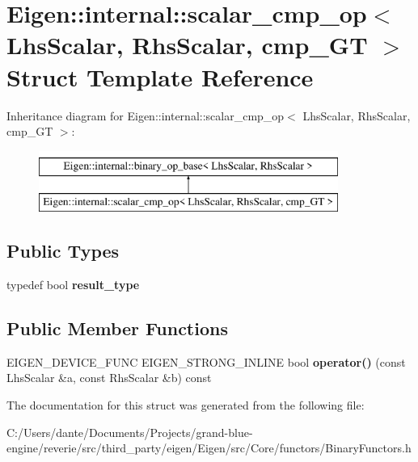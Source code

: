 \hypertarget{struct_eigen_1_1internal_1_1scalar__cmp__op_3_01_lhs_scalar_00_01_rhs_scalar_00_01cmp___g_t_01_4}{}\section{Eigen\+::internal\+::scalar\+\_\+cmp\+\_\+op$<$ Lhs\+Scalar, Rhs\+Scalar, cmp\+\_\+\+GT $>$ Struct Template Reference}
\label{struct_eigen_1_1internal_1_1scalar__cmp__op_3_01_lhs_scalar_00_01_rhs_scalar_00_01cmp___g_t_01_4}
Inheritance diagram for Eigen\+::internal\+::scalar\+\_\+cmp\+\_\+op$<$ Lhs\+Scalar, Rhs\+Scalar, cmp\+\_\+\+GT $>$\+:\begin{figure}[H]
\begin{center}
\leavevmode
\includegraphics[height=2.000000cm]{struct_eigen_1_1internal_1_1scalar__cmp__op_3_01_lhs_scalar_00_01_rhs_scalar_00_01cmp___g_t_01_4}
\end{center}
\end{figure}
\subsection*{Public Types}
\begin{DoxyCompactItemize}
\item 
\mbox{\label{struct_eigen_1_1internal_1_1scalar__cmp__op_3_01_lhs_scalar_00_01_rhs_scalar_00_01cmp___g_t_01_4_a63f2f79bc3837f533c7ab841ee619795}} 
typedef bool {\bfseries result\+\_\+type}
\end{DoxyCompactItemize}
\subsection*{Public Member Functions}
\begin{DoxyCompactItemize}
\item 
\mbox{\label{struct_eigen_1_1internal_1_1scalar__cmp__op_3_01_lhs_scalar_00_01_rhs_scalar_00_01cmp___g_t_01_4_ad70e5a12c40ec132e812c44656f50fa6}} 
E\+I\+G\+E\+N\+\_\+\+D\+E\+V\+I\+C\+E\+\_\+\+F\+U\+NC E\+I\+G\+E\+N\+\_\+\+S\+T\+R\+O\+N\+G\+\_\+\+I\+N\+L\+I\+NE bool {\bfseries operator()} (const Lhs\+Scalar \&a, const Rhs\+Scalar \&b) const
\end{DoxyCompactItemize}


The documentation for this struct was generated from the following file\+:\begin{DoxyCompactItemize}
\item 
C\+:/\+Users/dante/\+Documents/\+Projects/grand-\/blue-\/engine/reverie/src/third\+\_\+party/eigen/\+Eigen/src/\+Core/functors/Binary\+Functors.\+h\end{DoxyCompactItemize}
